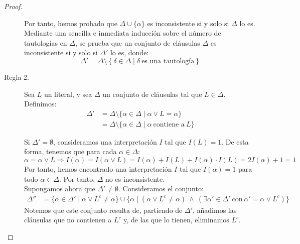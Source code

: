 \begin{teo}
\begin{proof}
\begin{description}
                Por tanto, hemos probado que $\Delta\cup \{\alpha\}$ es inconsistente si y solo si $\Delta$ lo es.\\

                Mediante una sencilla e inmediata inducción sobre el número de tautologías en $\Delta$, se prueba que un conjunto de cláusulas $\Delta$ es inconsistente si y solo si $\Delta'$ lo es, donde:
                \begin{equation*}
                    \Delta'=\Delta\setminus \left\{\delta\in \Delta\mid \delta\ \text{es una tautología}\right\}
                \end{equation*}

                \item[Regla 2.] Sea $L$ un literal, y sea $\Delta$ un conjunto de cláusulas tal que $L\in \Delta$.
                Definimos:
                \begin{align*}
                    \Delta'&= \Delta\setminus \{\alpha\in \Delta \mid \alpha\lor L=\alpha\}\\
                    &= \Delta\setminus \{\alpha\in \Delta \mid \alpha\ \text{contiene a}\ L\}
                \end{align*}

                Si $\Delta'=\emptyset$, consideramos una interpretación $I$ tal que $I(L)=1$.
                De esta forma, tenemos que para cada $\alpha\in \Delta$:
                \begin{equation*}
                    \alpha=\alpha\lor L
                    \Longrightarrow
                    I(\alpha)=I(\alpha\lor L)=I(\alpha)+I(L)+I(\alpha)\cdot I(L)=2I(\alpha)+1=1
                \end{equation*}
                Por tanto, hemos encontrado una interpretación $I$ tal que $I(\alpha)=1$ para todo $\alpha\in \Delta$. Por tanto, $\Delta$ no es inconsistente.\\

                Supongamos ahora que $\Delta'\neq \emptyset$. Consideramos el conjunto:
                \begin{align*}
                    \Delta''&= \{ \alpha\in \Delta' \mid \alpha\lor L^c\neq \alpha\} \cup \{ \alpha\mid (\alpha\lor L^c\neq \alpha) \ \land \ (\exists \alpha'\in \Delta'\ \text{con}\ \alpha'=\alpha\lor L^c)\}
                \end{align*}
                Notemos que este conjunto resulta de, partiendo de $\Delta'$, añadimos las cláusulas que no contienen a $L^c$ y, de las que lo tienen, eliminamos $L^c$.


\end{description}
\end{proof}
\end{teo}
